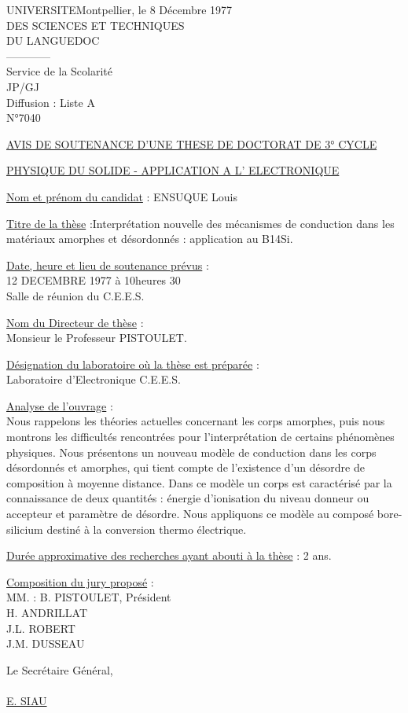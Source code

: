 UNIVERSITE\hfill Montpellier, le 8 Décembre 1977\\
DES SCIENCES ET TECHNIQUES\\
DU LANGUEDOC\\
------------\\
Service de la Scolarité\\
JP/GJ\\
Diffusion : Liste A\\
N°7040

\uline{AVIS DE SOUTENANCE D'UNE THESE DE DOCTORAT DE 3° CYCLE}

\uline{PHYSIQUE DU SOLIDE - APPLICATION A L' ELECTRONIQUE}

\uline{Nom et prénom du candidat} : ENSUQUE Louis

\uline{Titre de la thèse} :\textquotedbl{}Interprétation nouvelle des mécanismes de conduction dans les matériaux amorphes et désordonnés : application au B14Si\textquotedbl{}.

\uline{Date, heure et lieu de soutenance prévus} :\\
12 DECEMBRE 1977 à 10heures 30\\
Salle de réunion du C.E.E.S.

\uline{Nom du Directeur de thèse} :\\
Monsieur le Professeur PISTOULET.

\uline{Désignation du laboratoire où la thèse est préparée} :\\
Laboratoire d'Electronique C.E.E.S.

\uline{Analyse de l'ouvrage} :\\
Nous rappelons les théories actuelles concernant les corps amorphes, puis nous montrons les difficultés rencontrées pour l'interprétation de certains phénomènes physiques. Nous présentons un nouveau modèle de conduction dans les corps désordonnés et amorphes, qui tient compte de l'existence d'un désordre de composition à moyenne distance. Dans ce modèle un corps est caractérisé par la connaissance de deux quantités : énergie d'ionisation du niveau donneur ou accepteur et paramètre de désordre. Nous appliquons ce modèle au composé bore-silicium destiné à la conversion thermo électrique.

\uline{Durée approximative des recherches ayant abouti à la thèse} : 2 ans.

\uline{Composition du jury proposé} :\\
MM. : B. PISTOULET, Président\\
H. ANDRILLAT\\
J.L. ROBERT\\
J.M. DUSSEAU

Le Secrétaire Général,\\
\\
\uline{E. SIAU}

